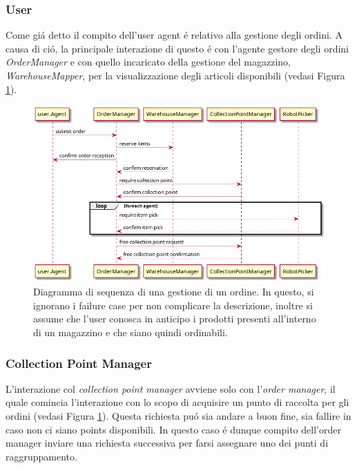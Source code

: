 \subsubsection{User}
Come gi\'a detto il compito dell'user agent \'e relativo alla gestione degli ordini. A causa di ci\'o, la principale interazione di questo \'e con l'agente gestore degli ordini \textit{OrderManager} e con quello incaricato della gestione del magazzino, \textit{WarehouseMapper}, per la visualizzazione degli articoli disponibili (vedasi Figura \ref{fig:order_management-sequence_diagram}).
\begin{figure}[!ht]\centering
    \includegraphics[width=\textwidth]{section/design/figure/order_management-sequence_diagram.png}
    \caption{Diagramma di sequenza di una gestione di un ordine. In questo, si ignorano i failure case per non complicare la descrizione, inoltre si assume che l'user conosca in anticipo i prodotti presenti all'interno di un magazzino e che siano quindi ordinabili.}
    \label{fig:order_management-sequence_diagram}
\end{figure}

\subsubsection{Collection Point Manager}
L'interazione col \textit{collection point manager} avviene solo con l'\textit{order manager}, il quale comincia l'interazione con lo scopo di acquisire un punto di raccolta per gli ordini (vedasi Figura \ref{fig:order_management-sequence_diagram}). Questa richiesta pu\'o sia andare a buon fine, sia fallire in caso non ci siano points disponibili. In questo caso \'e dunque compito dell'order manager inviare una richiesta successiva per farsi assegnare uno dei punti di raggruppamento.

